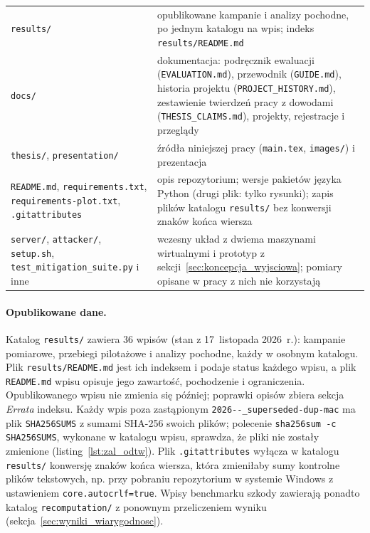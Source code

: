 \documentclass[a4paper,12pt]{article}
\begin{document}
\begin{table}[H]
\begin{tabularx}{\linewidth}{@{}L{5.2cm}Y@{}}
\texttt{results/} & opublikowane kampanie i analizy pochodne, po jednym katalogu na wpis; indeks \texttt{results/\allowbreak README.md} \\
\texttt{docs/} & dokumentacja: podręcznik ewaluacji (\texttt{EVALUATION.md}), przewodnik (\texttt{GUIDE.md}), historia projektu (\texttt{PROJECT\_\allowbreak HISTORY.md}), zestawienie twierdzeń pracy z dowodami (\texttt{THESIS\_\allowbreak CLAIMS.md}), projekty, rejestracje i przeglądy \\
\texttt{thesis/}, \texttt{presentation/} & źródła niniejszej pracy (\texttt{main.tex}, \texttt{images/}) i prezentacja \\
\texttt{README.md}, \texttt{requirements.txt}, \texttt{requirements-\allowbreak plot.txt}, \texttt{.gitattributes} & opis repozytorium; wersje pakietów języka Python (drugi plik: tylko rysunki); zapis plików katalogu \texttt{results/} bez konwersji znaków końca wiersza \\
\texttt{server/}, \texttt{attacker/}, \texttt{setup.sh}, \texttt{test\_\allowbreak mitigation\_\allowbreak suite.py} i inne & wczesny układ z dwiema maszynami wirtualnymi i prototyp z sekcji~\ref{sec:koncepcja_wyjsciowa}; pomiary opisane w pracy z nich nie korzystają \\
\bottomrule
\end{tabularx}
\end{table}

\paragraph{Opublikowane dane.} Katalog \texttt{results/} zawiera 36 wpisów (stan z 17~listopada 2026~r.): kampanie pomiarowe, przebiegi pilotażowe i analizy pochodne, każdy w osobnym katalogu. Plik \texttt{results/\allowbreak README.md} jest ich indeksem i podaje status każdego wpisu, a plik \texttt{README.md} wpisu opisuje jego zawartość, pochodzenie i ograniczenia. Opublikowanego wpisu nie zmienia się później; poprawki opisów zbiera sekcja \textit{Errata} indeksu. Każdy wpis poza zastąpionym \texttt{2026--\_\allowbreak superseded-\allowbreak dup-\allowbreak mac} ma plik \texttt{SHA256SUMS} z sumami SHA-256 swoich plików; polecenie \texttt{sha256sum -c SHA256SUMS}, wykonane w katalogu wpisu, sprawdza, że pliki nie zostały zmienione (listing~\ref{lst:zal_odtw}). Plik \texttt{.gitattributes} wyłącza w katalogu \texttt{results/} konwersję znaków końca wiersza, która zmieniłaby sumy kontrolne plików tekstowych, np. przy pobraniu repozytorium w systemie Windows z ustawieniem \texttt{core.autocrlf=true}. Wpisy benchmarku szkody zawierają ponadto katalog \texttt{recomputation/} z ponownym przeliczeniem wyniku (sekcja~\ref{sec:wyniki_wiarygodnosc}).
\end{document}
